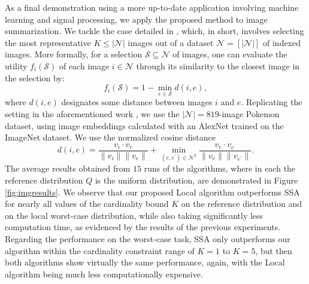 \documentclass[letter,11pt]{article}
\def\sS{\mathcal{S}}
\def\sN{\mathcal{N}}
\begin{document}
As a final demonstration using a more up-to-date application involving machine learning and signal processing, we apply the proposed method to image summarization. We tackle the case detailed in \cite{malherbe2022robustness}, which, in short, involves selecting the most representative $K \leq \lvert \sN\rvert$ images out of a dataset $\sN = [\lvert \sN \rvert]$ of indexed images. More formally, for a selection $\sS \subseteq \sN$ of images, one can evaluate the utility $f_i(\sS)$ of each image $i \in \sN$ through its similarity to the closest image in the selection by:
\begin{equation}
f_i(\sS) = 1 - \min_{e\in \sS} d(i, e),
\end{equation}
where $d(i, e)$ designates some distance between images $i$ and $e$. Replicating the setting in the aforementioned work \cite{malherbe2022robustness}, we use the $\lvert \sN \rvert = 819$-image Pokemon dataset\cite{Pokemon}, using image embeddings calculated with an AlexNet\cite{NEURIPS2018_7e448ed9} trained on the ImageNet dataset\cite{5206848}. We use the normalized cosine distance
\begin{equation}
d(i, e) = \frac{v_i \cdot v_e}{\lVert v_i\rVert \lVert v_e\rVert} + \min_{(e, e^{'}) \in \sN^2}\frac{v_e \cdot v_{e^{'}}}{\lVert v_e\rVert \lVert v_{e^{'}}\rVert}.
\end{equation}
The average results obtained from $15$ runs of the algorithms, where in each the reference distribution $Q$ is the uniform distribution, are demonstrated in Figure \ref{fig:imgresults}. We observe that our proposed Local algorithm outperforms SSA for nearly all values of the cardinality bound $K$ on the reference distribution and on the local worst-case distribution, while also taking significantly less computation time, as evidenced by the results of the previous experiments. Regarding the performance on the worst-case task, SSA only outperforms our algorithm within the cardinality constraint range of $K=1$ to $K=5$, but then both algorithms show virtually the same performance, again, with the Local algorithm being much less computationally expensive.
\end{document}
